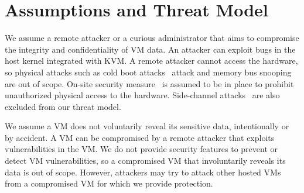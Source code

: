 \chapter{Assumptions and Threat Model}
\label{sec:threatmodel}

We assume a remote attacker or a curious administrator that aims to compromise
the integrity and confidentiality of VM data. An attacker can exploit bugs in
the host kernel integrated with KVM. A remote attacker cannot access the
hardware, so physical attacks such as cold boot attacks~\cite{coldboot}
attack and memory bus snooping are out of scope. On-site security
measure~\cite{googlesecuritywhitepaper} is assumed to be in place to prohibit
unauthorized physical access to the hardware.
Side-channel attacks~\cite{ristenpart09sc,zhang12sc,irazoqui15sc,zhang14sc,liu15sc,backes13sc}
are also excluded from our threat model.

We assume a VM does not voluntarily reveal its sensitive data, intentionally
or by accident. A VM can be compromised by a remote attacker that 
exploits vulnerabilities in the VM. We do not provide security features to 
prevent or detect VM vulnerabilities, so a compromised VM that involuntarily 
reveals its data is out of scope. However, attackers may try to attack 
other hosted VMs from a compromised VM for which we provide protection. 
